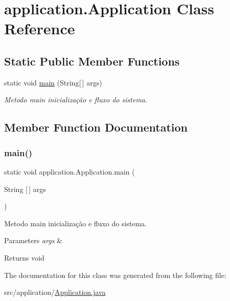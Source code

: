 \hypertarget{classapplication_1_1_application}{}\section{application.\+Application Class Reference}
\label{classapplication_1_1_application}
\subsection*{Static Public Member Functions}
\begin{DoxyCompactItemize}
\item 
static void \mbox{\hyperlink{classapplication_1_1_application_a578043d36fa02321128ff21ac2c9cfcb}{main}} (String\mbox{[}$\,$\mbox{]} args)
\begin{DoxyCompactList}\small\item\em Metodo main inicialização e fluxo do sistema. \end{DoxyCompactList}\end{DoxyCompactItemize}


\subsection{Member Function Documentation}
\mbox{\label{classapplication_1_1_application_a578043d36fa02321128ff21ac2c9cfcb}} 
\subsubsection{\texorpdfstring{main()}{main()}}
{\footnotesize\ttfamily static void application.\+Application.\+main (\begin{DoxyParamCaption}\item[{String \mbox{[}$\,$\mbox{]}}]{args }\end{DoxyParamCaption})\hspace{0.3cm}{\ttfamily [static]}}



Metodo main inicialização e fluxo do sistema. 


\begin{DoxyParams}{Parameters}
{\em args} & \\
\hline
\end{DoxyParams}
\begin{DoxyReturn}{Returns}
void 
\end{DoxyReturn}


The documentation for this class was generated from the following file\+:\begin{DoxyCompactItemize}
\item 
src/application/\mbox{\hyperlink{_application_8java}{Application.\+java}}\end{DoxyCompactItemize}
